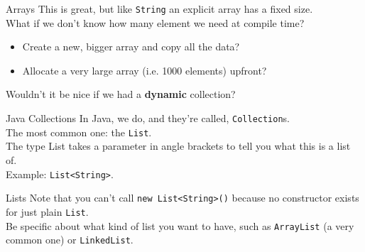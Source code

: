 \documentclass{beamer}
\begin{document}
\begin{frame}{Arrays}
This is great, but like \texttt{String} an explicit array has a fixed size. \\
\vspace{0.5em}
What if we don't know how many element we need at compile time? \\
\vspace{0.5em}
\begin{itemize}
\item Create a new, bigger array and copy all the data?  \\
\item Allocate a very large array (i.e. 1000 elements) upfront? \\
\end{itemize}
\vspace{0.5em}
Wouldn't it be nice if we had a \textbf{dynamic} collection? \\
\end{frame}



\begin{frame}{Java Collections}
In Java, we do, and they're called, \texttt{Collection}s. \\
\vspace{1em}
The most common one: the \texttt{List}.  \\
\vspace{1em}
The type List takes a parameter in angle brackets to tell you what this is a list of. \\
\vspace{1em}
Example: \texttt{List<String>}. \\
\end{frame}



\begin{frame}{Lists}
Note that you can't call \texttt{new List<String>()} because no constructor exists for just plain \texttt{List}. \\
\vspace{1em}
Be specific about what kind of list you want to have, such as \texttt{ArrayList} (a very common one) or \texttt{LinkedList}. \\
\end{frame}
\end{document}

